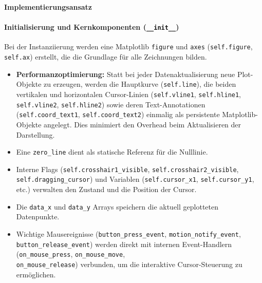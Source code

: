 \documentclass[a4paper, portrait, 12pt]{scrartcl} %
\begin{document}
\textbf{Implementierungsansatz}
\paragraph{Initialisierung und Kernkomponenten (\texttt{\_\_init\_\_})}
Bei der Instanziierung werden eine Matplotlib \texttt{figure} und \texttt{axes} (\texttt{self.figure}, \texttt{self.ax}) erstellt, die die Grundlage für alle Zeichnungen bilden.
\begin{itemize}
    \item \textbf{Performanzoptimierung:} Statt bei jeder Datenaktualisierung neue Plot-Objekte zu erzeugen, werden die Hauptkurve (\texttt{self.line}), die beiden vertikalen und horizontalen Cursor-Linien (\texttt{self.vline1}, \texttt{self.hline1}, \texttt{self.vline2}, \texttt{self.hline2}) sowie deren Text-Annotationen (\texttt{self.coord\_text1}, \texttt{self.coord\_text2}) einmalig als persistente Matplotlib-Objekte angelegt. Dies minimiert den Overhead beim Aktualisieren der Darstellung.
    \item Eine \texttt{zero\_line} dient als statische Referenz für die Nulllinie.
    \item Interne Flags (\texttt{self.crosshair1\_visible}, \texttt{self.crosshair2\_visible}, \\\texttt{self.dragging\_cursor}) und Variablen (\texttt{self.cursor\_x1}, \texttt{self.cursor\_y1}, etc.) verwalten den Zustand und die Position der Cursor.
    \item Die \texttt{data\_x} und \texttt{data\_y} Arrays speichern die aktuell geplotteten Datenpunkte.
    \item Wichtige Mausereignisse (\texttt{button\_press\_event}, \texttt{motion\_notify\_event}, \\\texttt{button\_release\_event}) werden direkt mit internen Event-Handlern (\texttt{on\_mouse\_press}, \texttt{on\_mouse\_move}, \\\texttt{on\_mouse\_release}) verbunden, um die interaktive Cursor-Steuerung zu ermöglichen.
\end{itemize}
\end{document}
